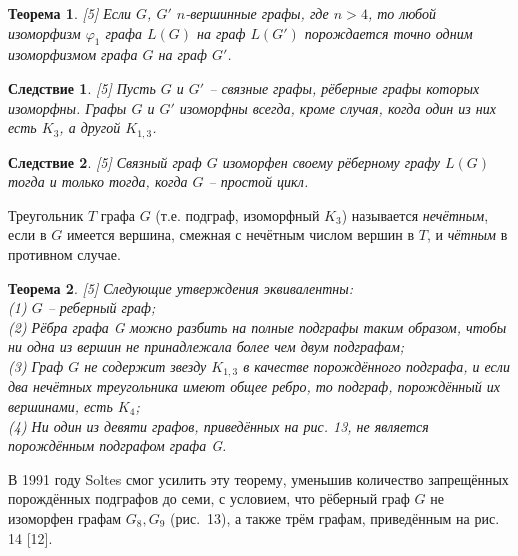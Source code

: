 \documentclass[12pt]{article}
\newtheorem{theorem}{\hspace{1cm}Теорема}
\newtheorem{result}{\hspace{1cm}Следствие}
\begin{document}

\begin{theorem} 
	\label{t5} 
	[5]
Если $G$, $G'$ $n$-вершинные графы, где $n>4$, то любой изоморфизм $\varphi_1$ графа $L(G)$ на граф $L(G')$ порождается точно одним изоморфизмом графа $G$ на граф $G'$.
\end{theorem}	


 \begin{result}
 	\label{r1}
	[5]
 Пусть $G$ и $G'$ -- связные графы, рёберные графы которых изоморфны. Графы $G$ и $G'$ изоморфны всегда, кроме случая, когда один из них есть $K_3$, а другой $K_{1,3}$.
 \end{result}
 
 \begin{result} 
 	\label{r2}
 	[5]
 	Связный граф $G$ изоморфен своему рёберному графу $L(G)$ тогда и только тогда, когда $G$ -- простой цикл.
 \end{result}
 
Треугольник $T$ графа $G$ (т.е. подграф, изоморфный $K_3$) называется {\it нечётным}, если в $G$ имеется вершина, смежная с нечётным числом вершин в $T$, и {\it чётным} в противном случае.

\begin{theorem}
	\label{t7}
[5]
Следующие утверждения эквивалентны:
\\(1) $G$ -- реберный граф;
\\(2) Рёбра графа G можно разбить на полные подграфы таким образом, чтобы ни одна из вершин не принадлежала более чем двум подграфам;
\\(3) Граф $G$ не содержит звезду $K_{1,3}$ в качестве порождённого подграфа, и если два нечётных треугольника имеют общее ребро, то подграф, порождённый их вершинами, есть $K_4$;
\\(4) Ни один из девяти графов, приведённых на рис. 13, не является порождённым подграфом графа G.
\end{theorem}

В 1991 году Soltes смог усилить эту теорему, уменьшив количество запрещённых порождённых подграфов до семи, с условием, что рёберный граф $G$  не изоморфен графам $G_8, G_9$ (рис.~13), а также трём графам, приведённым на рис. 14 [12].
\end{document}
